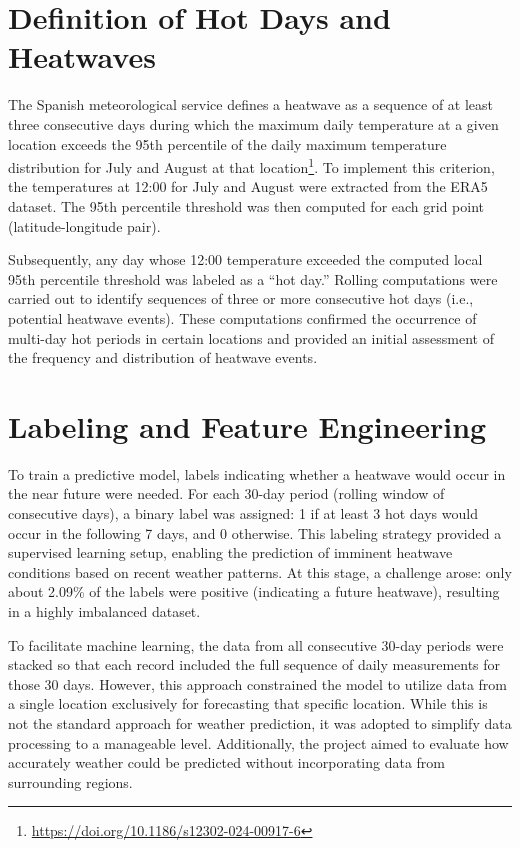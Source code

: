 \documentclass[conference,9pt]{IEEEtran}
\begin{document}
\section{Definition of Hot Days and Heatwaves}
\label{heatDef}
The Spanish meteorological service defines a heatwave as a sequence of at least three consecutive days during which the maximum daily temperature at a given location exceeds the 95th percentile of the daily maximum temperature distribution for July and August at that location\footnote{\url{https://doi.org/10.1186/s12302-024-00917-6}}. To implement this criterion, the temperatures at 12:00 for July and August were extracted from the ERA5 dataset. The 95th percentile threshold was then computed for each grid point (latitude-longitude pair).

Subsequently, any day whose 12:00 temperature exceeded the computed local 95th percentile threshold was labeled as a ``hot day.'' Rolling computations were carried out to identify sequences of three or more consecutive hot days (i.e., potential heatwave events). These computations confirmed the occurrence of multi-day hot periods in certain locations and provided an initial assessment of the frequency and distribution of heatwave events.

\section{Labeling and Feature Engineering}
To train a predictive model, labels indicating whether a heatwave would occur in the near future were needed. For each 30-day period (rolling window of consecutive days), a binary label was assigned: 1 if at least 3 hot days would occur in the following 7 days, and 0 otherwise. This labeling strategy provided a supervised learning setup, enabling the prediction of imminent heatwave conditions based on recent weather patterns. At this stage, a challenge arose: only about 2.09\% of the labels were positive (indicating a future heatwave), resulting in a highly imbalanced dataset. 

To facilitate machine learning, the data from all consecutive 30-day periods were stacked so that each record included the full sequence of daily measurements for those 30 days. However, this approach constrained the model to utilize data from a single location exclusively for forecasting that specific location. While this is not the standard approach for weather prediction, it was adopted to simplify data processing to a manageable level. Additionally, the project aimed to evaluate how accurately weather could be predicted without incorporating data from surrounding regions.
\end{document}
